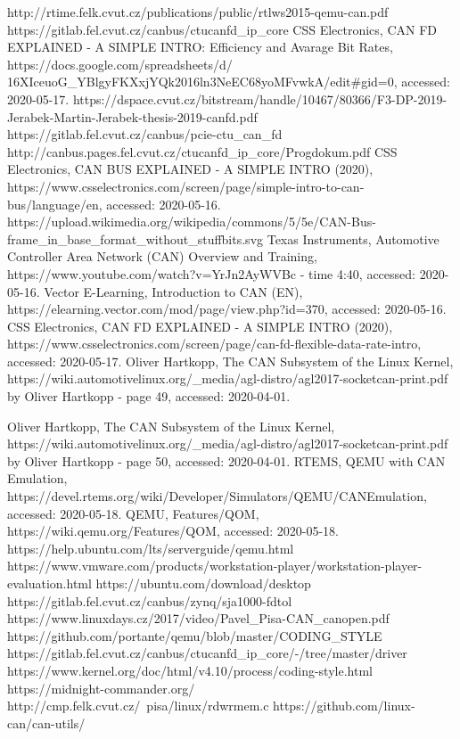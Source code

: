 \documentclass{ctuthesis}
\begin{document}
 
\renewcommand\bibname{References}
\begin{thebibliography}{1}
 http://rtime.felk.cvut.cz/publications/public/rtlws2015-qemu-can.pdf
 https://gitlab.fel.cvut.cz/canbus/ctucanfd\_ip\_core
 CSS Electronics, CAN FD EXPLAINED - A SIMPLE INTRO: Efficiency and Avarage Bit Rates, https://docs.google.com/spreadsheets/d/\\16XIceuoG\_YBlgyFKXxjYQk2016ln3NeEC68yoMFvwkA/edit\#gid=0, accessed: 2020-05-17.
 https://dspace.cvut.cz/bitstream/handle/10467/80366/F3-DP-2019-Jerabek-Martin-Jerabek-thesis-2019-canfd.pdf
 https://gitlab.fel.cvut.cz/canbus/pcie-ctu\_can\_fd
 http://canbus.pages.fel.cvut.cz/ctucanfd\_ip\_core/Progdokum.pdf
 CSS Electronics, CAN BUS EXPLAINED - A SIMPLE INTRO (2020), https://www.csselectronics.com/screen/page/simple-intro-to-can-bus/language/en, accessed: 2020-05-16.
 https://upload.wikimedia.org/wikipedia/commons/5/5e/CAN-Bus-frame\_in\_base\_format\_without\_stuffbits.svg
 Texas Instruments, Automotive Controller Area Network (CAN) Overview and Training, https://www.youtube.com/watch?v=YrJn2AyWVBc - time 4:40, accessed: 2020-05-16.
 Vector E-Learning, Introduction to CAN (EN), https://elearning.vector.com/mod/page/view.php?id=370, accessed: 2020-05-16.
 CSS Electronics, CAN FD EXPLAINED - A SIMPLE INTRO (2020), https://www.csselectronics.com/screen/page/can-fd-flexible-data-rate-intro, accessed: 2020-05-17.
 Oliver Hartkopp, The CAN Subsystem of the Linux Kernel, https://wiki.automotivelinux.org/\_media/agl-distro/agl2017-socketcan-print.pdf by Oliver Hartkopp - page 49, accessed: 2020-04-01.

 Oliver Hartkopp, The CAN Subsystem of the Linux Kernel, https://wiki.automotivelinux.org/\_media/agl-distro/agl2017-socketcan-print.pdf by Oliver Hartkopp - page 50, accessed: 2020-04-01.
 RTEMS, QEMU with CAN Emulation, https://devel.rtems.org/wiki/Developer/Simulators/QEMU/CANEmulation, accessed: 2020-05-18.
 QEMU, Features/QOM, https://wiki.qemu.org/Features/QOM, accessed: 2020-05-18.
 https://help.ubuntu.com/lts/serverguide/qemu.html
 https://www.vmware.com/products/workstation-player/workstation-player-evaluation.html
 https://ubuntu.com/download/desktop
 https://gitlab.fel.cvut.cz/canbus/zynq/sja1000-fdtol
 https://www.linuxdays.cz/2017/video/Pavel\_Pisa-CAN\_canopen.pdf
 https://github.com/portante/qemu/blob/master/CODING\_STYLE
 https://gitlab.fel.cvut.cz/canbus/ctucanfd\_ip\_core/-/tree/master/driver
 https://www.kernel.org/doc/html/v4.10/process/coding-style.html
 https://midnight-commander.org/
 http://cmp.felk.cvut.cz/~pisa/linux/rdwrmem.c
 https://github.com/linux-can/can-utils/
\end{thebibliography}
 
\end{document}
